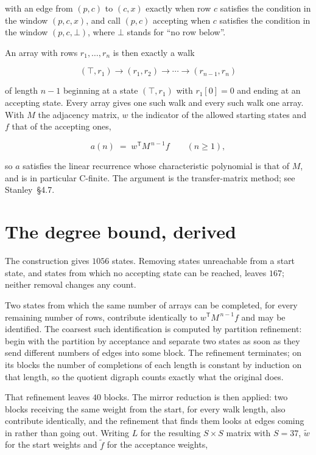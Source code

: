 \documentclass[11pt]{article}
\theoremstyle{definition}
\begin{document}
with an edge from $(p,c)$ to $(c,x)$ exactly when row $c$ satisfies the condition in the window $(p,c,x)$, and call $(p,c)$ accepting when $c$ satisfies the condition in the window $(p,c,\bot)$, where $\bot$ stands for ``no row below''.

An array with rows $r_1,\dots,r_n$ is then exactly a walk

\[(\top,r_1) \to (r_1,r_2) \to \cdots \to (r_{n-1},r_n)\]

of length $n-1$ beginning at a state $(\top,r_1)$ with $r_1[0]=0$ and ending at an accepting state. Every array gives one such walk and every such walk one array. With $M$ the adjacency matrix, $w$ the indicator of the allowed starting states and $f$ that of the accepting ones,

\[a(n) \;=\; w^{\mathsf T} M^{\,n-1} f \qquad (n \ge 1),\]

so $a$ satisfies the linear recurrence whose characteristic polynomial is that of $M$, and is in particular C-finite. The argument is the transfer-matrix method; see Stanley~\S4.7.

\section{The degree bound, derived}

The construction gives $1056$ states. Removing states unreachable from a start state, and states from which no accepting state can be reached, leaves $167$; neither removal changes any count.

Two states from which the same number of arrays can be completed, for every remaining number of rows, contribute identically to $w^{\mathsf T}M^{\,n-1}f$ and may be identified. The coarsest such identification is computed by partition refinement: begin with the partition by acceptance and separate two states as soon as they send different numbers of edges into some block. The refinement terminates; on its blocks the number of completions of each length is constant by induction on that length, so the quotient digraph counts exactly what the original does.

That refinement leaves $40$ blocks. The mirror reduction is then applied: two blocks receiving the same weight from the start, for every walk length, also contribute identically, and the refinement that finds them looks at edges coming in rather than going out. Writing $L$ for the resulting $S \times S$ matrix with $S = 37$, $\tilde w$ for the start weights and $\tilde f$ for the acceptance weights,
\end{document}
